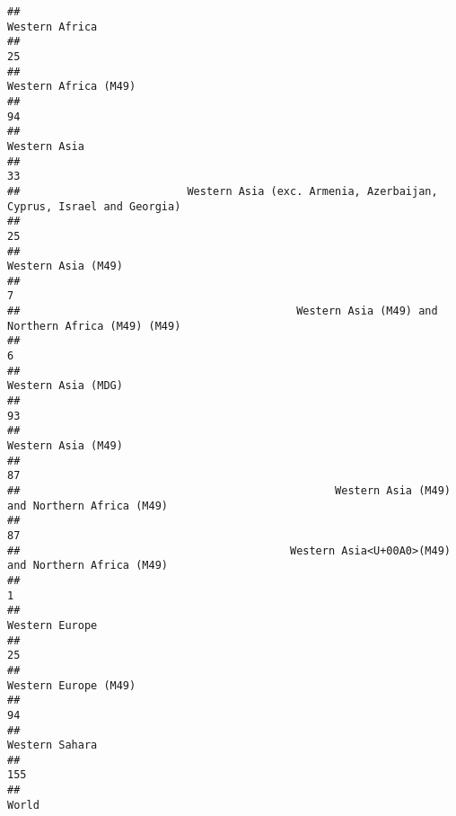 \documentclass[]{article}
\begin{document}
\begin{verbatim}
##                                                                               Western Africa 
##                                                                                           25 
##                                                                         Western Africa (M49) 
##                                                                                           94 
##                                                                                 Western Asia 
##                                                                                           33 
##                          Western Asia (exc. Armenia, Azerbaijan, Cyprus, Israel and Georgia) 
##                                                                                           25 
##                                                                           Western Asia (M49) 
##                                                                                            7 
##                                           Western Asia (M49) and Northern Africa (M49) (M49) 
##                                                                                            6 
##                                                                           Western Asia (MDG) 
##                                                                                           93 
##                                                                           Western Asia (M49) 
##                                                                                           87 
##                                                 Western Asia (M49) and Northern Africa (M49) 
##                                                                                           87 
##                                          Western Asia<U+00A0>(M49) and Northern Africa (M49) 
##                                                                                            1 
##                                                                               Western Europe 
##                                                                                           25 
##                                                                         Western Europe (M49) 
##                                                                                           94 
##                                                                               Western Sahara 
##                                                                                          155 
##                                                                                        World 

\end{verbatim}
\end{document}
